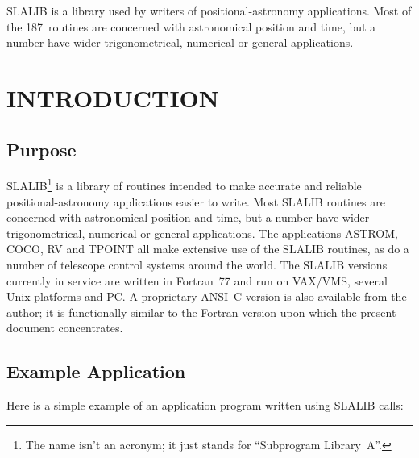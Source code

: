 \documentclass[11pt,twoside]{article}
\newcommand{\stardocinitials}  {SUN}
\newcommand{\stardocnumber}    {67.64}
\newcommand{\stardocname}{\stardocinitials /\stardocnumber}
\newenvironment{latexonly}{}{}
\newcommand{\latexonlytoc}[0]{\tableofcontents}
\newcommand{\nroutines} {187}
\renewcommand{\thepage}{\roman{page}}
\begin{document}
SLALIB is a library used by writers of positional-astronomy applications.
Most of the \nroutines\ routines are concerned with astronomical position
and time,
but a number have wider trigonometrical, numerical or general applications.
 \newpage
 \begin{latexonly}
   \setlength{\parskip}{0mm}
   \latexonlytoc
   \setlength{\parskip}{\medskipamount}
   \markright{\stardocname}
 \end{latexonly}
\newpage
\renewcommand{\thepage}{\arabic{page}}
\setcounter{page}{1}

\section{INTRODUCTION}
\subsection{Purpose}
SLALIB\footnote{The name isn't an acronym;
it just stands for ``Subprogram Library~A''.}
is a library of routines
intended to make accurate and reliable positional-astronomy
applications easier to write.
Most SLALIB routines are concerned with astronomical position and time, but a
number have wider trigonometrical, numerical or general applications.
The applications ASTROM, COCO, RV and TPOINT
all make extensive use of the SLALIB
routines, as do a number of telescope control systems around the world.
The SLALIB versions currently in service are written in
Fortran~77 and run on VAX/VMS, several Unix platforms and PC.
A proprietary ANSI~C version is also available from the author;  it is
functionally similar to the Fortran version upon which the present
document concentrates.

\subsection{Example Application}
Here is a simple example of an application program written
using SLALIB calls:
\end{document}
